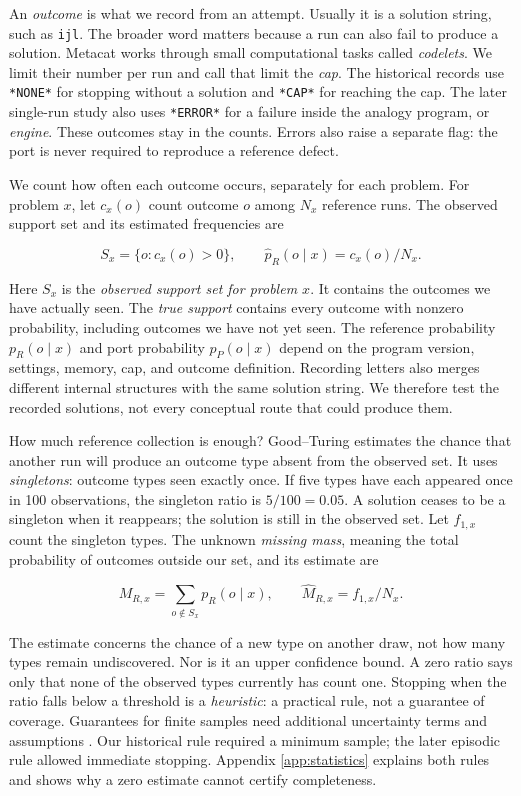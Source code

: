 \documentclass[10pt,letterpaper]{article}
\begin{document}
An \emph{outcome} is what we record from an attempt. Usually it is a solution string, such
as \texttt{ijl}. The broader word matters because a run can also fail to produce a
solution. Metacat works through small computational tasks called \emph{codelets}. We limit
their number per run and call that limit the \emph{cap}. The historical records use
\texttt{*NONE*} for stopping without a solution and \texttt{*CAP*} for reaching the cap.
The later single-run study also uses \texttt{*ERROR*} for a failure inside the analogy
program, or \emph{engine}. These outcomes stay in the counts. Errors also raise a separate
flag: the port is never required to reproduce a reference defect.

We count how often each outcome occurs, separately for each problem. For problem \(x\),
let \(c_x(o)\) count outcome \(o\) among \(N_x\) reference runs. The observed support set
and its estimated frequencies are

\[
S_x=\{o:c_x(o)>0\},\qquad \widehat p_R(o\mid x)=c_x(o)/N_x.
\]

Here \(S_x\) is the \emph{observed support set for problem \(x\)}. It contains the
outcomes we have actually seen. The \emph{true support} contains every outcome with
nonzero probability, including outcomes we have not yet seen. The reference probability
\(p_R(o\mid x)\) and port probability \(p_P(o\mid x)\) depend on the program version,
settings, memory, cap, and outcome definition. Recording letters also merges different
internal structures with the same solution string. We therefore test the recorded
solutions, not every conceptual route that could produce them.

How much reference collection is enough? Good--Turing \citep{ref8} estimates the chance
that another run will produce an outcome type absent from the observed set. It uses
\emph{singletons}: outcome types seen exactly once. If five types have each appeared once
in 100 observations, the singleton ratio is \(5/100=0.05\). A solution ceases to be a
singleton when it reappears; the solution is still in the observed set. Let \(f_{1,x}\)
count the singleton types. The unknown \emph{missing mass}, meaning the total probability
of outcomes outside our set, and its estimate are

\[
M_{R,x}=\sum_{o\notin S_x}p_R(o\mid x),\qquad
\widehat M_{R,x}=f_{1,x}/N_x.
\]

The estimate concerns the chance of a new type on another draw, not how many types remain
undiscovered. Nor is it an upper confidence bound. A zero ratio says only that none of the
observed types currently has count one. Stopping when the ratio falls below a threshold is
a \emph{heuristic}: a practical rule, not a guarantee of coverage. Guarantees for finite
samples need additional uncertainty terms and assumptions \citep{ref10}. Our historical
rule required a minimum sample; the later episodic rule allowed immediate stopping.
Appendix \ref{app:statistics} explains both rules and shows why a zero estimate cannot
certify completeness.
\end{document}
